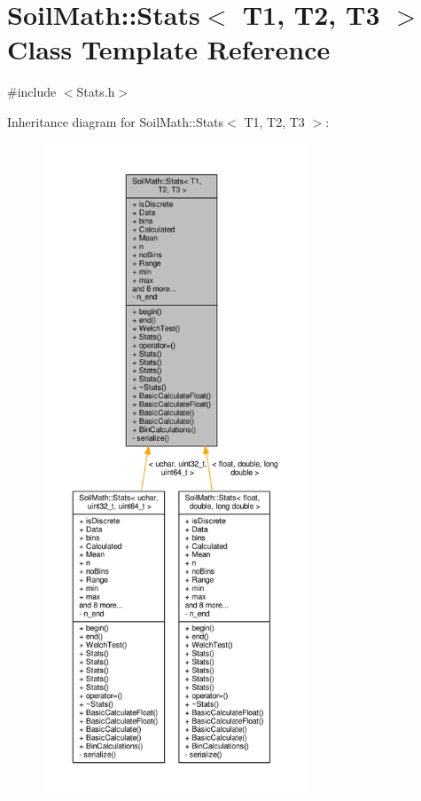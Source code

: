 \hypertarget{class_soil_math_1_1_stats}{}\section{Soil\+Math\+:\+:Stats$<$ T1, T2, T3 $>$ Class Template Reference}
\label{class_soil_math_1_1_stats}


{\ttfamily \#include $<$Stats.\+h$>$}



Inheritance diagram for Soil\+Math\+:\+:Stats$<$ T1, T2, T3 $>$\+:\nopagebreak
\begin{figure}[H]
\begin{center}
\leavevmode
\includegraphics[height=550pt]{class_soil_math_1_1_stats__inherit__graph}
\end{center}
\end{figure}


